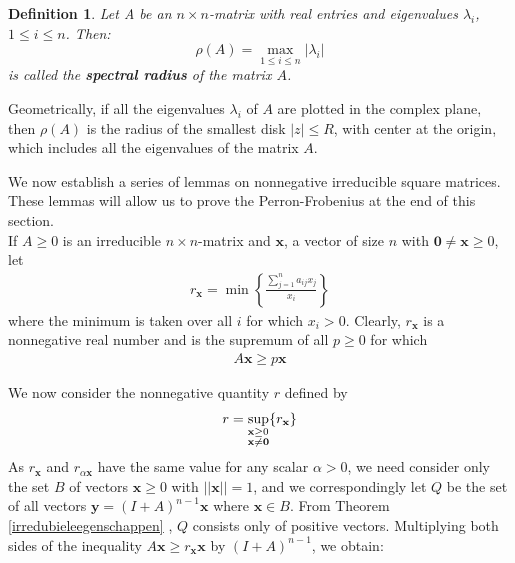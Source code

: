\documentclass[a4paper,11pt]{report}
\newtheorem{definition}[theorem]{Definition}
\begin{document}
 \begin{definition}
  Let A be an $n\times n$-matrix with real entries and eigenvalues $\lambda_i$,
  $1 \leq i \leq n$. Then:
  $$\rho(A) = \max_{1 \leq i \leq n} |\lambda_i|$$
  is called the \textbf{spectral radius} of the matrix $A$.
\end{definition}

Geometrically, if all the eigenvalues $\lambda_i$ of $A$ are plotted in the 
complex plane, then $\rho(A)$ is the radius of the smallest disk $|z| \leq 
R$, with center at the origin, which includes all the eigenvalues of the matrix 
$A$.

 We now establish a series of lemmas on nonnegative irreducible square matrices. 
 These lemmas will allow us to prove the Perron-Frobenius at the end of this
 section.\\
 
 If $A \geq 0$ is an irreducible $n\times n$-matrix and $\mathbf{x}$, a vector of size $n$ with $\mathbf{0} \not = \mathbf{x} \geq 0$, let
 \begin{eqnarray}
r_\mathbf{x} = \min\left\{\frac{\sum^n_{j=1}a_{ij}x_j}{x_i}\right\}
  \end{eqnarray}
 where the minimum is taken over all $i$ for which $x_i > 0$. Clearly, $r_\mathbf{x}$ is 
 a nonnegative real number and is the supremum of all $p \geq 0$ for 
 which 
  \begin{eqnarray}\label{eenvoudigefrob}
A\mathbf{x} \geq p\mathbf{x}  \end{eqnarray}
 
  We now consider the nonnegative quantity $r$ defined by 
 \begin{eqnarray}\label{eenvoudigefrob2}\label{quantityr}
   r = \sup_{\begin{subarray}{l}\mathbf{x} \geq 0\\
    \mathbf{x}\not = \mathbf{0}\end{subarray}} \{r_\mathbf{x}\}
 \end{eqnarray}
As $r_{\mathbf{x}}$ and $r_{\alpha\mathbf{x}}$ 
have the same value for any 
scalar $\alpha > 0$, we need consider only the set $B$ of vectors $\mathbf{x} \geq 0$ 
with $||\mathbf{x}|| = 1$, and we correspondingly let $Q$ be the set of all vectors $\mathbf{y}=(I+A)^{n-1}\mathbf{x}$ 
where $\mathbf{x} \in B$. From Theorem \ref{irredubieleegenschappen} , $Q$ 
consists only of positive vectors. Multiplying both sides of the inequality $A\mathbf{x} \geq r_{\mathbf{x}}\mathbf{x}$
by $(I+A)^{n-1}$, we obtain:
\end{document}
